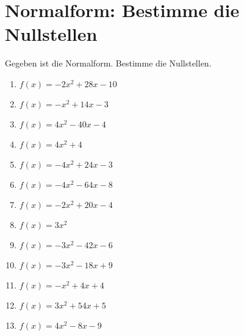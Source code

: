 \documentclass{article}%
\begin{document}
\section{Normalform: Bestimme die Nullstellen}%
\label{sec:NormalformBestimmedieNullstellen}%
Gegeben ist die Normalform. Bestimme die Nullstellen.%
\begin{enumerate}[label=\alph*)]%
\item%
\newline\vspace{0.5cm} $f(x)=-2x^2 + 28x - 10$%
\item%
\newline\vspace{0.5cm} $f(x)=-x^2 + 14x - 3$%
\item%
\newline\vspace{0.5cm} $f(x)=4x^2 - 40x - 4$%
\item%
\newline\vspace{0.5cm} $f(x)=4x^2 + 4$%
\item%
\newline\vspace{0.5cm} $f(x)=-4x^2 + 24x - 3$%
\item%
\newline\vspace{0.5cm} $f(x)=-4x^2 - 64x - 8$%
\item%
\newline\vspace{0.5cm} $f(x)=-2x^2 + 20x - 4$%
\item%
\newline\vspace{0.5cm} $f(x)=3x^2$%
\item%
\newline\vspace{0.5cm} $f(x)=-3x^2 - 42x - 6$%
\item%
\newline\vspace{0.5cm} $f(x)=-3x^2 - 18x + 9$%
\item%
\newline\vspace{0.5cm} $f(x)=-x^2 + 4x + 4$%
\item%
\newline\vspace{0.5cm} $f(x)=3x^2 + 54x + 5$%
\item%
\newline\vspace{0.5cm} $f(x)=4x^2 - 8x - 9$%

\end{enumerate}
\end{document}
